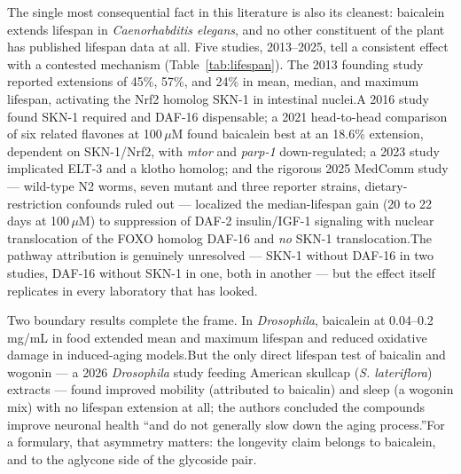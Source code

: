 \documentclass[11pt]{article}
\newcommand{\src}[1]{\allowbreak[#1]}
\begin{document}
The single most consequential fact in this literature is also its cleanest: baicalein extends lifespan in \textit{Caenorhabditis elegans}, and no other constituent of the plant has published lifespan data at all. Five studies, 2013--2025, tell a consistent effect with a contested mechanism (Table~\ref{tab:lifespan}). The 2013 founding study reported extensions of 45\%, 57\%, and 24\% in mean, median, and maximum lifespan, activating the Nrf2 homolog SKN-1 in intestinal nuclei.\src{200} A 2016 study found SKN-1 required and DAF-16 dispensable; a 2021 head-to-head comparison of six related flavones at 100\,$\mu$M found baicalein best at an 18.6\% extension, dependent on SKN-1/Nrf2, with \textit{mtor} and \textit{parp-1} down-regulated; a 2023 study implicated ELT-3 and a klotho homolog; and the rigorous 2025 MedComm study --- wild-type N2 worms, seven mutant and three reporter strains, dietary-restriction confounds ruled out --- localized the median-lifespan gain (20 to 22 days at 100\,$\mu$M) to suppression of DAF-2 insulin/IGF-1 signaling with nuclear translocation of the FOXO homolog DAF-16 and \emph{no} SKN-1 translocation.\src{203}\src{212}\src{218}\src{167} The pathway attribution is genuinely unresolved --- SKN-1 without DAF-16 in two studies, DAF-16 without SKN-1 in one, both in another --- but the effect itself replicates in every laboratory that has looked.\src{167}

Two boundary results complete the frame. In \textit{Drosophila}, baicalein at 0.04--0.2 mg/mL in food extended mean and maximum lifespan and reduced oxidative damage in induced-aging models.\src{209} But the only direct lifespan test of baicalin and wogonin --- a 2026 \textit{Drosophila} study feeding American skullcap (\textit{S. lateriflora}) extracts --- found improved mobility (attributed to baicalin) and sleep (a wogonin mix) with no lifespan extension at all; the authors concluded the compounds improve neuronal health ``and do not generally slow down the aging process.''\src{226} For a formulary, that asymmetry matters: the longevity claim belongs to baicalein, and to the aglycone side of the glycoside pair.
\end{document}
